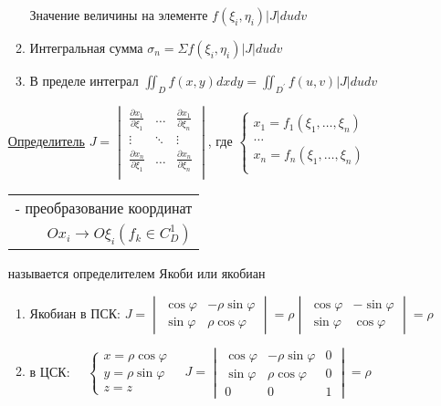 \documentclass[12pt]{article}
\begin{document}
\begin{enumerate}
\begin{enumerate}
            Значение величины на элементе $f(\xi_i, \eta_i) |J| du dv$
            \item Интегральная сумма $\sigma_n = \Sigma f(\xi_i, \eta_i) |J| du dv$
            \item В пределе интеграл $\iint_D f(x, y) dx dy = \iint_{D^\prime} f(u, v) |J| du dv$
        \end{enumerate}

        \hyperlink{determinantJaсobi}{Определитель}
        $J = \begin{vmatrix}
             \frac{\partial x_1}{\partial \xi_1} & \dots  & \frac{\partial x_1}{\partial \xi_n} \\
             \vdots                              & \ddots & \vdots                              \\
             \frac{\partial x_n}{\partial \xi_1} & \dots  & \frac{\partial x_n}{\partial \xi_n} \\
        \end{vmatrix}$, где $\begin{cases}
             x_1 = f_1(\xi_1, \dots, \xi_n) \\
             \dots \\
             x_n = f_n(\xi_1, \dots, \xi_n) \\
        \end{cases}$ \begin{tabular}{r} - преобразование координат \\ $Ox_i \to O\xi_i (f_k \in C^1_D)$ \end{tabular}

        называется определителем Якоби или якобиан

        \begin{enumerate}
            \item Якобиан в ПСК: $J = \begin{vmatrix}\cos\varphi & -\rho\sin\varphi \\ \sin\varphi & \rho\cos\varphi\end{vmatrix} =
            \rho \begin{vmatrix}\cos\varphi & -\sin\varphi \\ \sin\varphi & \cos\varphi\end{vmatrix} = \rho$

            \item в ЦСК: $\quad \begin{cases}
                                  x = \rho\cos\varphi \\ y = \rho\sin\varphi \\ z = z
            \end{cases} \quad J = \begin{vmatrix}\cos\varphi & -\rho\sin\varphi & 0 \\ \sin\varphi & \rho\cos\varphi & 0 \\ 0 & 0 & 1\end{vmatrix} = \rho$
        \end{enumerate}


\end{enumerate}
\end{document}
